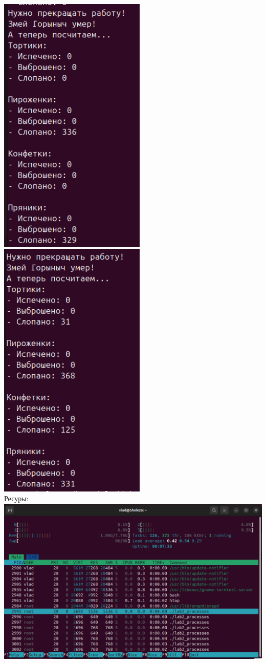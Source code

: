 \documentclass[a4paper,14pt]{extarticle}
\begin{document}
\includegraphics[width=70mm]{processes_output_4_6}
\includegraphics[width=70mm]{processes_output_4_7}\\
Ресуры:\\
\includegraphics[width=140mm]{processes_resources_4}\bigbreak
\end{document}
